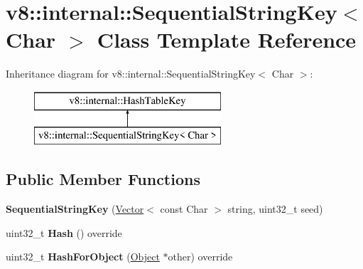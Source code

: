 \hypertarget{classv8_1_1internal_1_1_sequential_string_key}{}\section{v8\+:\+:internal\+:\+:Sequential\+String\+Key$<$ Char $>$ Class Template Reference}
\label{classv8_1_1internal_1_1_sequential_string_key}
Inheritance diagram for v8\+:\+:internal\+:\+:Sequential\+String\+Key$<$ Char $>$\+:\begin{figure}[H]
\begin{center}
\leavevmode
\includegraphics[height=2.000000cm]{classv8_1_1internal_1_1_sequential_string_key}
\end{center}
\end{figure}
\subsection*{Public Member Functions}
\begin{DoxyCompactItemize}
\item 
{\bfseries Sequential\+String\+Key} (\hyperlink{classv8_1_1internal_1_1_vector}{Vector}$<$ const Char $>$ string, uint32\+\_\+t seed)\hypertarget{classv8_1_1internal_1_1_sequential_string_key_a8e111bccfdc098c61428e82fec78a26c}{}\label{classv8_1_1internal_1_1_sequential_string_key_a8e111bccfdc098c61428e82fec78a26c}

\item 
uint32\+\_\+t {\bfseries Hash} () override\hypertarget{classv8_1_1internal_1_1_sequential_string_key_af39989c3af9c243fdfe978afb54ee3ed}{}\label{classv8_1_1internal_1_1_sequential_string_key_af39989c3af9c243fdfe978afb54ee3ed}

\item 
uint32\+\_\+t {\bfseries Hash\+For\+Object} (\hyperlink{classv8_1_1internal_1_1_object}{Object} $\ast$other) override\hypertarget{classv8_1_1internal_1_1_sequential_string_key_a4d0e2687e53c6b9f657f5c460c252acb}{}\label{classv8_1_1internal_1_1_sequential_string_key_a4d0e2687e53c6b9f657f5c460c252acb}

\end{DoxyCompactItemize}
